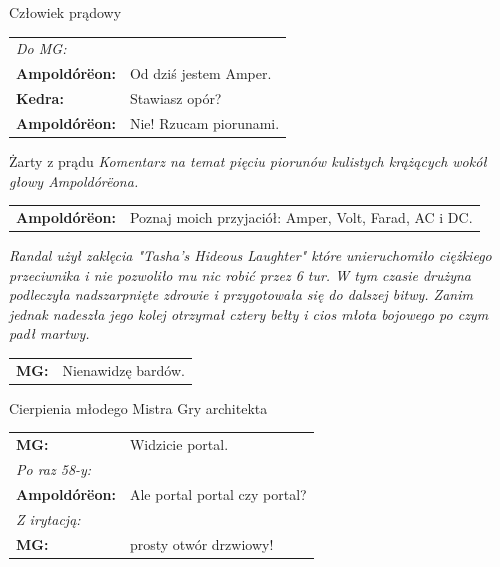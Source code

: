 \documentclass[10pt,twoside,twocolumn]{book}
\begin{document}
\begin{rpg-quotebox}{Człowiek prądowy}
   \begin{tabularx}{\columnwidth}{lX}
      \multicolumn{2}{l}{\textit{Do MG:}}\\
      \textbf{Ampoldórëon:} & Od dziś jestem Amper.\\
      \textbf{Kedra:} & Stawiasz opór?\\
      \textbf{Ampoldórëon:} & Nie! Rzucam piorunami.\\
   \end{tabularx}
\end{rpg-quotebox}


\begin{rpg-quotebox}{Żarty z prądu}
   \textit{Komentarz na temat pięciu piorunów kulistych krążących wokół głowy Ampoldórëona.}\\

   \begin{tabularx}{\columnwidth}{lX}
      \textbf{Ampoldórëon:} & Poznaj moich przyjaciół: Amper, Volt, Farad, AC i DC.\\
   \end{tabularx}
\end{rpg-quotebox}


\begin{rpg-quotebox}{}
   \textit{Randal użył zaklęcia "Tasha's Hideous Laughter" które unieruchomiło ciężkiego przeciwnika i nie pozwoliło mu nic robić przez 6 tur. W tym czasie drużyna podleczyła nadszarpnięte zdrowie i przygotowała się do dalszej bitwy. Zanim jednak nadeszła jego kolej otrzymał cztery bełty i cios młota bojowego po czym padł martwy.}\\

   \begin{tabularx}{\columnwidth}{lX}
      \textbf{MG:} & Nienawidzę bardów.\\
   \end{tabularx}
\end{rpg-quotebox}


\begin{rpg-quotebox}{Cierpienia młodego Mistra Gry architekta}
   \begin{tabularx}{\columnwidth}{lX}
      \textbf{MG:} & Widzicie portal.\\
      \multicolumn{2}{l}{\textit{Po raz 58-y:}}\\
      \textbf{Ampoldórëon:} & Ale portal portal czy portal?\\
      \multicolumn{2}{l}{\textit{Z irytacją:}}\\
      \textbf{MG:} & prosty otwór drzwiowy!\\
   \end{tabularx}
\end{rpg-quotebox}
\end{document}
